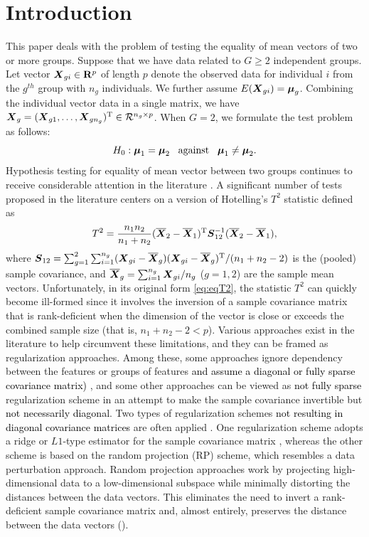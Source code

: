 \documentclass[times,sort&compress,3p]{elsarticle}
\theoremstyle{plain}%
\theoremstyle{definition}
\def\be{\begin{eqnarray}}
\def\ee{\end{eqnarray}}
\def\trans{^{\rm T}}
\newcommand{\uS}       {\mbox{\boldmath$S$}}
\newcommand{\uX}       {\mbox{\boldmath$X$}}
\newcommand{\umu}               {\mbox{\boldmath$\mu$}}
\begin{document}
\section{Introduction} \label{sec:intro}

This paper deals with the problem of testing the equality of mean vectors of two or more groups. Suppose that we have data related to $G \geq 2$ independent groups. Let vector $\uX_{gi} \in \mathbf{R}^{p}$ of length $p$ denote the observed data for individual $i$ from the $g^{th}$ group with $n_{g}$ individuals. We further assume $E(\uX_{gi}) = \umu_g$.  
Combining the individual vector data in a single matrix, we have $\uX_{g} = (\uX_{g1}, \ldots, \uX_{gn_g})\trans \in \mathcal{R}^{n_g \times p}$. When $G=2$, we formulate the test problem as follows:
$$ H_{0}: \umu_1 = \umu_2\;\;\;\mbox{against}\;\;\;  \umu_1 \neq \umu_2.  $$
Hypothesis testing for equality of mean vector between two groups continues to receive considerable attention in the literature \cite{zhang2019more, chen2019two}. A significant number of tests proposed in the literature centers on a version of Hotelling's $T^2$ statistic defined as
\be
T^{2} = \frac{n_1n_2}{n_1 + n_2}(\overline{\uX}_2 - \overline{\uX}_1)\trans\uS^{-1}_{12} (\overline{\uX}_2 - \overline{\uX}_1), \label{eq:eqT2}
\ee
where $\uS_{12} = \sum^{2}_{g=1}\sum^{n_g}_{i=1}(\uX_{gi} - \overline{\uX}_g)(\uX_{gi} - \overline{\uX}_g)\trans /(n_1+n_2 - 2)$ is the (pooled) sample covariance, and $\overline{\uX}_g = \sum^{n_g}_{i=1}\uX_{gi}/n_g$ ($g = 1,2$) are the sample mean vectors.
Unfortunately, in its original form \eqref{eq:eqT2}, the statistic $T^2$ can quickly become ill-formed since it involves the inversion of a sample covariance matrix that is rank-deficient when the dimension of the vector is close or exceeds the combined sample size (that is, $n_1+n_2-2 < p$). Various approaches exist in the literature to help circumvent these limitations, and they can be framed as regularization approaches. Among these, some approaches ignore dependency between the features or groups of features \textcolor{black}{and assume a diagonal or fully sparse covariance matrix)} \cite{ahmad2014u,bai1996effect,chen2010two,feng2017composite}, and some other approaches can be viewed as \textcolor{black}{not fully sparse} regularization scheme in an attempt to make the sample covariance invertible but \textcolor{black}{not necessarily diagonal}. Two types of regularization schemes \textcolor{black}{not resulting in diagonal covariance matrices} are often applied \cite{hu2020pairwise}. One regularization scheme adopts a ridge or $L1$-type estimator for the sample covariance matrix \cite{chen2011regularized,li2020adaptable}, whereas the other scheme is based on the random projection (RP) scheme, which resembles a data perturbation approach. Random projection approaches work by projecting high-dimensional data to a low-dimensional subspace while minimally distorting the distances between the data vectors. This eliminates the need to invert a rank-deficient sample covariance matrix and, almost entirely, preserves the distance between the data vectors (\cite{johnson84extensionslipschitz}). 
\end{document}
